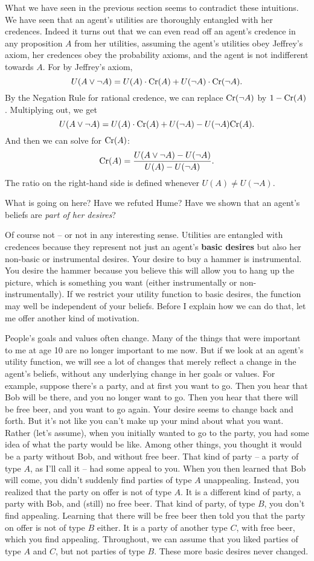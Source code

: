 What we have seen in the previous section seems to contradict these
intuitions. We have seen that an agent's utilities are thoroughly
entangled with her credences. Indeed it turns out that we can even
read off an agent's credence in any proposition $A$ from her
utilities, assuming the agent's utilities obey Jeffrey's axiom, her
credences obey the probability axioms, and the agent is not
indifferent towards $A$. For by Jeffrey's axiom,
\[
  U(A \lor \neg A) = U(A)\cdot \text{Cr}(A) + U(\neg A)\cdot \text{Cr}(\neg A).
\]
By the Negation Rule for rational credence, we can replace
$\text{Cr}(\neg A)$ by $1 - \text{Cr}(A)$. Multiplying out, we get
\[
  U(A \lor \neg A) = U(A)\cdot \text{Cr}(A) + U(\neg A) - U(\neg A)\text{Cr}(A).
\]
And then we can solve for $\text{Cr}(A)$:
\[
  \text{Cr}(A) = \frac{U(A \lor \neg A) - U(\neg A)}{U(A) - U(\neg A)}.
\]
The ratio on the right-hand side is defined whenever $U(A) \not= U(\neg A)$.

What is going on here? Have we refuted Hume? Have we shown that an
agent's beliefs are \emph{part of her desires}? 

Of course not -- or not in any interesting sense. Utilities are
entangled with credences because they represent not just an agent's
\textbf{basic desires} but also her non-basic or instrumental
desires. Your desire to buy a hammer is instrumental. You desire the
hammer because you believe this will allow you to hang up the picture,
which is something you want (either instrumentally or
non-instrumentally). If we restrict your utility function to basic
desires, the function may well be independent of your beliefs.  Before
I explain how we can do that, let me offer another kind of motivation.

People's goals and values often change. Many of the things that were
important to me at age 10 are no longer important to me now. But if we
look at an agent's utility function, we will see a lot of changes that
merely reflect a change in the agent's beliefs, without any underlying
change in her goals or values. For example, suppose there's a party,
and at first you want to go. Then you hear that Bob will be there, and
you no longer want to go. Then you hear that there will be free beer,
and you want to go again. Your desire seems to change back and
forth. But it's not like you can't make up your mind about what you
want. Rather (let's assume), when you initially wanted to go to the
party, you had some idea of what the party would be like. Among other
things, you thought it would be a party without Bob, and without free
beer. That kind of party -- a party of type $A$, as I'll call it --
had some appeal to you. When you then learned that Bob will come, you
didn't suddenly find parties of type $A$ unappealing. Instead, you
realized that the party on offer is not of type $A$. It is a different
kind of party, a party with Bob, and (still) no free beer. That kind
of party, of type $B$, you don't find appealing. Learning that there
will be free beer then told you that the party on offer is not of type
$B$ either. It is a party of another type $C$, with free beer, which
you find appealing. Throughout, we can assume that you liked parties
of type $A$ and $C$, but not parties of type $B$. These more basic
desires never changed.


